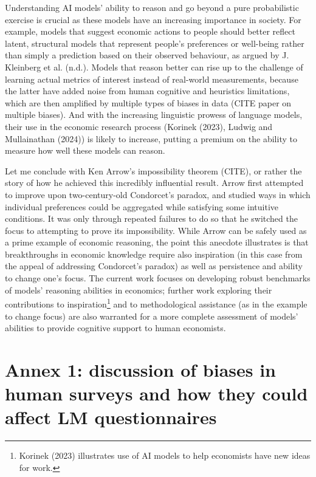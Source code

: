 \documentclass[
]{article}
\begin{document}
Understanding AI models' ability to reason and go beyond a pure
probabilistic exercise is crucial as these models have an increasing
importance in society. For example, models that suggest economic actions
to people should better reflect latent, structural models that represent
people's preferences or well-being rather than simply a prediction based
on their observed behaviour, as argued by J. Kleinberg et al. (n.d.).
Models that reason better can rise up to the challenge of learning
actual metrics of interest instead of real-world measurements, because
the latter have added noise from human cognitive and heuristics
limitations, which are then amplified by multiple types of biases in
data (CITE paper on multiple biases). And with the increasing linguistic
prowess of language models, their use in the economic research process
(Korinek (2023), Ludwig and Mullainathan (2024)) is likely to increase,
putting a premium on the ability to measure how well these models can
reason.

Let me conclude with Ken Arrow's impossibility theorem (CITE), or rather
the story of how he achieved this incredibly influential result. Arrow
first attempted to improve upon two-century-old Condorcet's paradox, and
studied ways in which individual preferences could be aggregated while
satisfying some intuitive conditions. It was only through repeated
failures to do so that he switched the focus to attempting to prove its
impossibility. While Arrow can be safely used as a prime example of
economic reasoning, the point this anecdote illustrates is that
breakthroughs in economic knowledge require also inspiration (in this
case from the appeal of addressing Condorcet's paradox) as well as
persistence and ability to change one's focus. The current work focuses
on developing robust benchmarks of models' reasoning abilities in
economics; further work exploring their contributions to
inspiration\footnote{Korinek (2023) illustrates use of AI models to help
  economists have new ideas for work.} and to methodological assistance
(as in the example to change focus) are also warranted for a more
complete assessment of models' abilities to provide cognitive support to
human economists.

\section{Annex 1: discussion of biases in human surveys and how they
could affect LM
questionnaires}\label{annex-1-discussion-of-biases-in-human-surveys-and-how-they-could-affect-lm-questionnaires}
\end{document}
